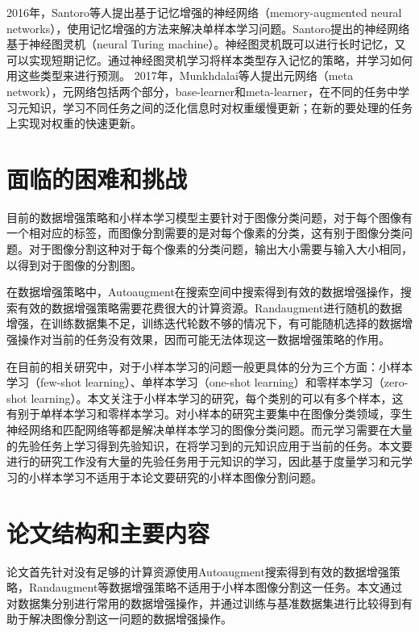 \documentclass[AutoFakeBold]{LZUThesis}
\begin{document}
\begin{itemize}[topsep=5pt,listparindent=25pt]
          2016年，Santoro等人提出基于记忆增强的神经网络（memory-augmented neural networks）\textsuperscript{\cite{santoro2016meta}}，使用记忆增强的方法来解决单样本学习问题。Santoro提出的神经网络基于神经图灵机（neural Turing machine）\textsuperscript{\cite{graves2014neural}}。神经图灵机既可以进行长时记忆，又可以实现短期记忆。通过神经图灵机学习将样本类型存入记忆的策略，并学习如何用这些类型来进行预测。
          2017年，Munkhdalai等人提出元网络（meta network）\textsuperscript{\cite{munkhdalai2017meta}}，元网络包括两个部分，base-learner和meta-learner，在不同的任务中学习元知识，学习不同任务之间的泛化信息时对权重缓慢更新；在新的要处理的任务上实现对权重的快速更新。
\end{itemize}



\section{面临的困难和挑战}
目前的数据增强策略和小样本学习模型主要针对于图像分类问题，对于每个图像有一个相对应的标签，而图像分割需要的是对每个像素的分类，这有别于图像分类问题。对于图像分割这种对于每个像素的分类问题，输出大小需要与输入大小相同，以得到对于图像的分割图。

在数据增强策略中，Autoaugment在搜索空间中搜索得到有效的数据增强操作，搜索有效的数据增强策略需要花费很大的计算资源。Randaugment进行随机的数据增强，在训练数据集不足，训练迭代轮数不够的情况下，有可能随机选择的数据增强操作对当前的任务没有效果，因而可能无法体现这一数据增强策略的作用。

在目前的相关研究中，对于小样本学习的问题一般更具体的分为三个方面：小样本学习（few-shot learning）\textsuperscript{\cite{wang2018low}}、单样本学习（one-shot learning）\textsuperscript{\cite{fe2003bayesian}}和零样本学习（zero-shot learning）\textsuperscript{\cite{fu2018recent}}。本文关注于小样本学习的研究，每个类别的可以有多个样本，这有别于单样本学习和零样本学习。对小样本的研究主要集中在图像分类领域，孪生神经网络和匹配网络等都是解决单样本学习的图像分类问题。而元学习需要在大量的先验任务上学习得到先验知识，在将学习到的元知识应用于当前的任务。本文要进行的研究工作没有大量的先验任务用于元知识的学习，因此基于度量学习和元学习的小样本学习不适用于本论文要研究的小样本图像分割问题。



\section{论文结构和主要内容}
论文首先针对没有足够的计算资源使用Autoaugment搜索得到有效的数据增强策略，Randaugment等数据增强策略不适用于小样本图像分割这一任务。本文通过对数据集分别进行常用的数据增强操作，并通过训练与基准数据集进行比较得到有助于解决图像分割这一问题的数据增强操作。
\end{document}
